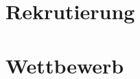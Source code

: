 \section{Rekrutierung}\label{app:Rekrutierung}

\newpage

\section{Wettbewerb}\label{app:Wettbewerb}

\newpage





%
%
%